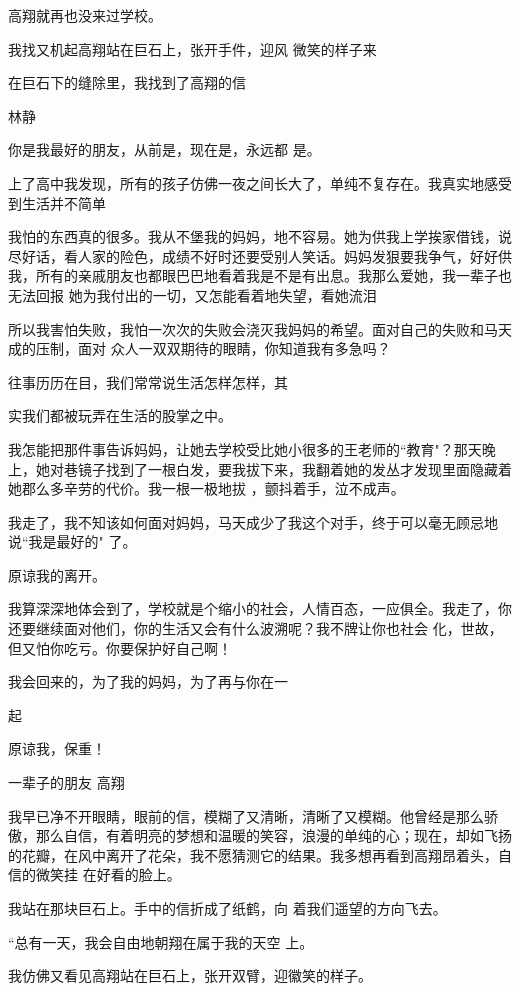 \documentclass{article}
\begin{document}
高翔就再也没来过学校。 

我找又机起高翔站在巨石上，张开手件，迎风
微笑的样子来 


\newpage

在巨石下的缝除里，我找到了高翔的信 


林静 

你是我最好的朋友，从前是，现在是，永远都
是。 

上了高中我发现，所有的孩子仿佛一夜之间长大了，单纯不复存在。我真实地感受到生活并不简单

我怕的东西真的很多。我从不堡我的妈妈，地不容易。她为供我上学挨家借钱，说尽好话，看人家的险色，成绩不好时还要受别人笑话。妈妈发狠要我争气，好好供我，所有的亲戚朋友也都眼巴巴地看着我是不是有出息。我那么爱她，我一辈子也无法回报
她为我付出的一切，又怎能看着地失望，看她流泪 

所以我害怕失败，我怕一次次的失败会浇灭我妈妈的希望。面对自己的失败和马天成的压制，面对
众人一双双期待的眼睛，你知道我有多急吗？ 

往事历历在目，我们常常说生活怎样怎样，其
\newpage

实我们都被玩弄在生活的股掌之中。 

我怎能把那件事告诉妈妈，让她去学校受比她小很多的王老师的“教育"？那天晚上，她对巷镜子找到了一根白发，要我拔下来，我翻着她的发丛才发现里面隐藏着她郡么多辛劳的代价。我一根一极地拔
，颤抖着手，泣不成声。 

我走了，我不知该如何面对妈妈，马天成少了我这个对手，终于可以毫无顾忌地说“我是最好的"
了。 


原谅我的离开。 

我算深深地体会到了，学校就是个缩小的社会，人情百态，一应俱全。我走了，你还要继续面对他们，你的生活又会有什么波溯呢？我不牌让你也社会
化，世故，但又怕你吃亏。你要保护好自己啊！ 

我会回来的，为了我的妈妈，为了再与你在一

\newpage
起 


原谅我，保重！ 


一辈子的朋友 高翔 

我早已净不开眼睛，眼前的信，模糊了又清晰，清晰了又模糊。他曾经是那么骄傲，那么自信，有着明亮的梦想和温暖的笑容，浪漫的单纯的心；现在，却如飞扬的花瓣，在风中离开了花朵，我不愿猜测它的结果。我多想再看到高翔昂着头，自信的微笑挂
在好看的脸上。 

我站在那块巨石上。手中的信折成了纸鹤，向
着我们遥望的方向飞去。 

“总有一天，我会自由地朝翔在属于我的天空
上。 

我仿佛又看见高翔站在巨石上，张开双臂，迎徽笑的样子。
\end{document}

